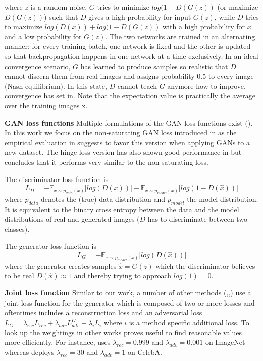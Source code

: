 \documentclass[12pt,a4paper]{article}
\begin{document}
where $z$ is a random noise. $G$ tries to minimize $log(1 - D(G(z))$ (or maximize $D(G(z))$) such that $D$ gives a high probability for input $G(z)$, while $D$ tries to maximize $log(D(x)) + log(1 - D(G(z))$ with a high probability for $x$ and a low probability for $G(z)$. The two networks are trained in an alternating manner: for every training batch, one network is fixed and the other is updated so that backpropagation happens in one network at a time exclusively. In an ideal convergence scenario, $G$ has learned to produce samples so realistic that $D$ cannot discern them from real images and assigns probability 0.5 to every image (Nash equilibrium). In this state, $D$ cannot teach $G$ anymore how to improve, convergence has set in. Note that the expectation value is practically the average over the training images x.

\par \textbf{GAN loss functions} 
Multiple formulations of the GAN loss functions exist (\cite{GANLandscape}). In this work we focus on the non-saturating GAN loss introduced in \cite{1406.2661} as the empirical evaluation in \cite{GANLandscape} suggests to favor this version when applying GANs to a new dataset. The hinge loss version has also shown good performance in \cite{1802.05957} but \cite{GANLandscape} concludes that it performs very similar to the non-saturating loss.

The discriminator loss function is
\begin{equation} \label{eq:d_loss}
    L_{D} = -\mathbb{E}_{x\sim p_{data} (x)}\big[log(D(x))\big] - \mathbb{E}_{\hat{x}\sim p_{model} (x)}\big[log(1 - D(\hat{x}))\big]
\end{equation}
where $p_{data}$ denotes the (true) data distribution and $p_{model}$ the model distribution. It is equivalent to the binary cross entropy between the data and the model distributions of real and generated images ($D$ has to discriminate between two classes).

The generator loss function is
\begin{equation} \label{eq:g_loss}
    L_{G} = -\mathbb{E}_{\hat{x}\sim p_{model} (x)}\big[log(D(\hat{x}))\big]
\end{equation}
where the generator creates samples $\hat{x} = G(z)$ which the discriminator believes to be real $D(\hat{x}) \approx 1$ and thereby trying to approach $log(1) = 0$.

\par \textbf{Joint loss function}
Similar to our work, a number of other methods (\cite{1511.05440},\cite{1711.07410},\cite{1604.07379}) use a joint loss function for the generator which is composed of two or more losses and oftentimes includes a reconstruction loss and an adversarial loss $L_G = \lambda_{rec}L_{rec} + \lambda_{adv}L^G_{adv} + \lambda_{i}L_{i}$ where $i$ is a method specific additional loss. To look up the weightings in other works proves useful to find reasonable values more efficiently. For instance, \cite{1604.07379} uses $\lambda_{rec} = 0.999$ and $\lambda_{adv} = 0.001$ on ImageNet whereas \cite{1711.07410} deploys $\lambda_{rec} = 30$ and $\lambda_{adv} = 1$ on CelebA.
\end{document}
